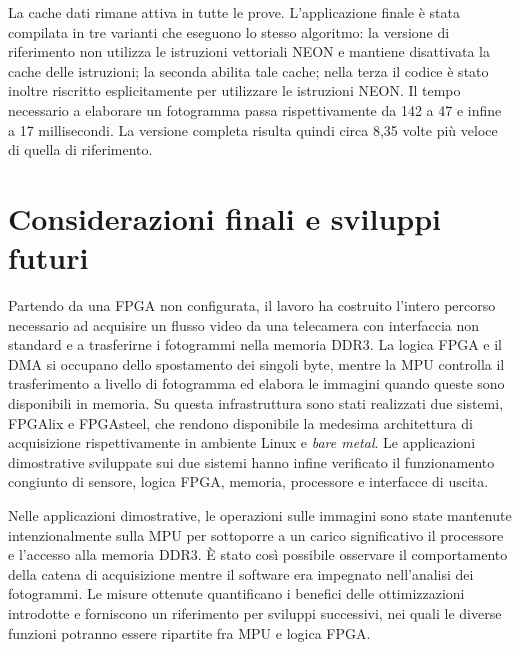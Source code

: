 \documentclass[a4paper,12pt]{article}
\begin{document}
La cache dati rimane attiva in tutte le prove. L'applicazione finale è stata compilata in tre varianti che eseguono lo stesso algoritmo: la versione di riferimento non utilizza le istruzioni vettoriali NEON e mantiene disattivata la cache delle istruzioni; la seconda abilita tale cache; nella terza il codice è stato inoltre riscritto esplicitamente per utilizzare le istruzioni NEON. Il tempo necessario a elaborare un fotogramma passa rispettivamente da 142 a 47 e infine a 17 millisecondi. La versione completa risulta quindi circa 8,35 volte più veloce di quella di riferimento.

\section{Considerazioni finali e sviluppi futuri}

Partendo da una FPGA non configurata, il lavoro ha costruito l'intero percorso necessario ad acquisire un flusso video da una telecamera con interfaccia non standard e a trasferirne i fotogrammi nella memoria DDR3. La logica FPGA e il DMA si occupano dello spostamento dei singoli byte, mentre la MPU controlla il trasferimento a livello di fotogramma ed elabora le immagini quando queste sono disponibili in memoria. Su questa infrastruttura sono stati realizzati due sistemi, FPGAlix e FPGAsteel, che rendono disponibile la medesima architettura di acquisizione rispettivamente in ambiente Linux e \emph{bare metal}. Le applicazioni dimostrative sviluppate sui due sistemi hanno infine verificato il funzionamento congiunto di sensore, logica FPGA, memoria, processore e interfacce di uscita.

Nelle applicazioni dimostrative, le operazioni sulle immagini sono state mantenute intenzionalmente sulla MPU per sottoporre a un carico significativo il processore e l'accesso alla memoria DDR3. È stato così possibile osservare il comportamento della catena di acquisizione mentre il software era impegnato nell'analisi dei fotogrammi. Le misure ottenute quantificano i benefici delle ottimizzazioni introdotte e forniscono un riferimento per sviluppi successivi, nei quali le diverse funzioni potranno essere ripartite fra MPU e logica FPGA.
\end{document}

